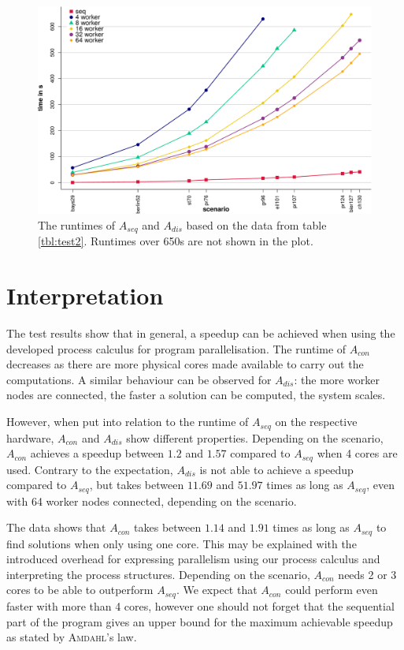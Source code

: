 \begin{figure}[h!]
  \centering
  \includegraphics[width=\textwidth]{img/test_distributed.pdf}
  \caption{The runtimes of $A_{seq}$ and $A_{dis}$ based on the data from table \ref{tbl:test2}. Runtimes over 650s are not shown in the plot.}
  \label{fig:test2}
\end{figure}

\clearpage
\section{Interpretation}
The test results show that in general, a speedup can be achieved when using the developed process calculus for program parallelisation. The runtime of $A_{con}$ decreases as there are more physical cores made available to carry out the computations. A similar behaviour can be observed for $A_{dis}$: the more worker nodes are connected, the faster a solution can be computed, the system scales.

However, when put into relation to the runtime of $A_{seq}$ on the respective hardware, $A_{con}$ and $A_{dis}$ show different properties. Depending on the scenario, $A_{con}$ achieves a speedup between $1.2$ and $1.57$ compared to $A_{seq}$ when 4 cores are used. Contrary to the expectation, $A_{dis}$ is not able to achieve a speedup compared to $A_{seq}$, but takes between $11.69$ and $51.97$ times as long as $A_{seq}$, even with 64 worker nodes connected, depending on the scenario.

The data shows that $A_{con}$ takes between $1.14$ and $1.91$ times as long as $A_{seq}$ to find solutions when only using one core. This may be explained with the introduced overhead for expressing parallelism using our process calculus and interpreting the process structures. Depending on the scenario, $A_{con}$ needs 2 or 3 cores to be able to outperform $A_{seq}$. We expect that $A_{con}$ could perform even faster with more than 4 cores, however one should not forget that the sequential part of the program gives an upper bound for the maximum achievable speedup as stated by \textsc{Amdahl}'s law.

